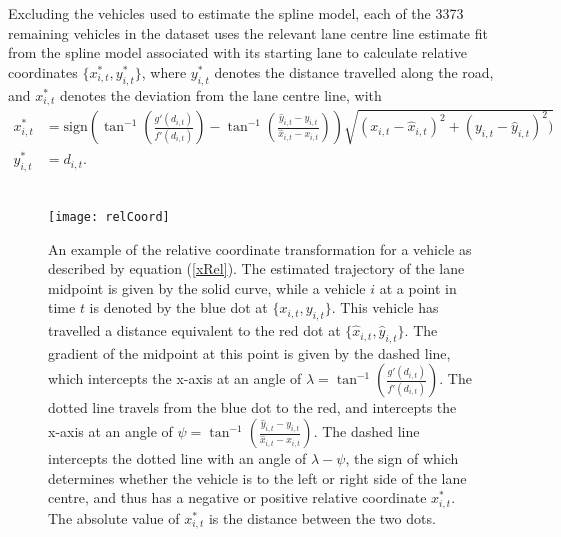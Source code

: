 \documentclass[12pt,a4paper]{article}\usepackage[]{graphicx}\usepackage[]{color}
\begin{document}
Excluding the vehicles used to estimate the spline model, each of the 3373 remaining vehicles in the dataset uses the relevant lane centre line estimate fit from the spline model associated with its starting lane to calculate relative coordinates $\{x^*_{i, t}, y^*_{i, t}\}$, where $y^*_{i, t}$ denotes the distance travelled along the road, and $x^*_{i, t}$ denotes the deviation from the lane centre line, with
\begin{align}
x^*_{i, t} &= \mbox{sign}\left(\tan^{-1}\left(\frac{g'(d_{i, t}) }{f'(d_{i, t})}\right) - \tan^{-1}\left(\frac{\hat{y}_{i, t} - y_{i, t}}{\hat{x}_{i, t} - x_{i, t}} \right)\right)\sqrt{(x_{i, t}-\hat{x}_{i, t})^2 + (y_{i, t} - \hat{y}_{i, t})^2)} \label{xRel} \\
y^*_{i, t} &= d_{i, t}. \label{yRel}
\end{align}
\\

\begin{figure}
\centering
\texttt{[image: relCoord]}
\caption{An example of the relative coordinate transformation for a vehicle as described by equation (\ref{xRel}). The estimated trajectory of the lane midpoint is given by the solid curve, while a vehicle $i$ at a point in time $t$ is denoted by the blue dot at $\{x_{i, t}, y_{i, t}\}$. This vehicle has travelled a distance equivalent to the red dot at $\{\hat{x}_{i, t}, \hat{y}_{i, t}\}$. The gradient of the midpoint at this point is given by the dashed line, which intercepts the x-axis at an angle of $\lambda = \tan^{-1}\left(\frac{g'(d_{i, t}) }{f'(d_{i, t})}\right)$. The dotted line travels from the blue dot to the red, and intercepts the x-axis at an angle of $\psi = \tan^{-1}\left(\frac{\hat{y}_{i, t} - y_{i, t}}{\hat{x}_{i, t} - x_{i, t}} \right)$. The dashed line intercepts the dotted line with an angle  of $\lambda - \psi$, the sign of which determines whether the vehicle is to the left or right side of the lane centre, and thus has a negative or positive relative coordinate $x^*_{i, t}$. The absolute value of $x^*_{i, t}$ is the distance between the two dots.}
\label{fig:relCoord}
\end{figure}
\end{document}

